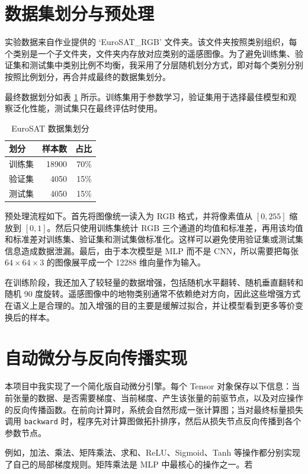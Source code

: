 \documentclass[UTF8,12pt,a4paper]{ctexart}
\begin{document}
\section{数据集划分与预处理}

实验数据来自作业提供的 `EuroSAT\_RGB' 文件夹。该文件夹按照类别组织，每个类别是一个子文件夹，文件夹内存放对应类别的遥感图像。为了避免训练集、验证集和测试集中类别比例不均衡，我采用了分层随机划分方式，即对每个类别分别按照比例划分，再合并成最终的数据集划分。

最终数据划分如表 \ref{tab:split} 所示。训练集用于参数学习，验证集用于选择最佳模型和观察泛化性能，测试集只在最终评估时使用。

\begin{table}[H]
\centering
\caption{EuroSAT 数据集划分}
\label{tab:split}
\begin{tabular}{lrr}
\toprule
划分 & 样本数 & 占比 \\
\midrule
训练集 & 18900 & 70\% \\
验证集 & 4050 & 15\% \\
测试集 & 4050 & 15\% \\
\bottomrule
\end{tabular}
\end{table}

预处理流程如下。首先将图像统一读入为 RGB 格式，并将像素值从 $[0,255]$ 缩放到 $[0,1]$。然后只使用训练集统计 RGB 三个通道的均值和标准差，再用该均值和标准差对训练集、验证集和测试集做标准化。这样可以避免使用验证集或测试集信息造成数据泄漏。最后，由于本次模型是 MLP 而不是 CNN，所以需要把每张 $64 \times 64 \times 3$ 的图像展平成一个 12288 维向量作为输入。

在训练阶段，我还加入了较轻量的数据增强，包括随机水平翻转、随机垂直翻转和随机 90 度旋转。遥感图像中的地物类别通常不依赖绝对方向，因此这些增强方式在语义上是合理的。加入增强的目的主要是缓解过拟合，并让模型看到更多等价变换后的样本。

\section{自动微分与反向传播实现}

本项目中我实现了一个简化版自动微分引擎。每个 Tensor 对象保存以下信息：当前张量的数据、是否需要梯度、当前梯度、产生该张量的前驱节点，以及对应操作的反向传播函数。在前向计算时，系统会自然形成一张计算图；当对最终标量损失调用 \verb|backward| 时，程序先对计算图做拓扑排序，然后从损失节点反向传播到各个参数节点。

例如，加法、乘法、矩阵乘法、求和、ReLU、Sigmoid、Tanh 等操作都分别实现了自己的局部梯度规则。矩阵乘法是 MLP 中最核心的操作之一。若
\end{document}
